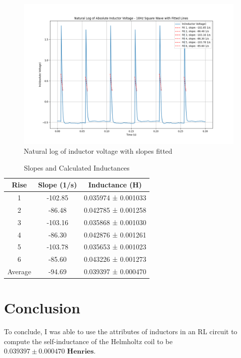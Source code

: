 \documentclass[12pt,letterpaper]{article}
\begin{document}
\begin{figure}[ht]
    \centering
    \includegraphics[width=5in]{images/ln_abs_inductor_voltage_square_with_fits.png}
    \caption{Natural log of inductor voltage with slopes fitted}
    \label{fig:square}
\end{figure}

\begin{table}[h]
\centering
\begin{tabular}{|c|c|c|}
\hline
Rise & Slope (1/s) & Inductance (H) \\
\hline
1 & -102.85 & 0.035974 ± 0.001033 \\
2 & -86.48 & 0.042785 ± 0.001258 \\
3 & -103.16 & 0.035868 ± 0.001030 \\
4 & -86.30 & 0.042876 ± 0.001261 \\
5 & -103.78 & 0.035653 ± 0.001023 \\
6 & -85.60 & 0.043226 ± 0.001273 \\
\hline
Average & -94.69 & 0.039397 ± 0.000470 \\
\hline
\end{tabular}
\caption{Slopes and Calculated Inductances}
\label{tab:inductances}
\end{table}


\section{Conclusion}

To conclude, I was able to use the attributes of inductors in an RL circuit to compute the self-inductance of the Helmholtz coil to be $\mathbf{0.039397 \pm 0.000470}\textbf{ Henries}$.


% 
% 
\end{document}
